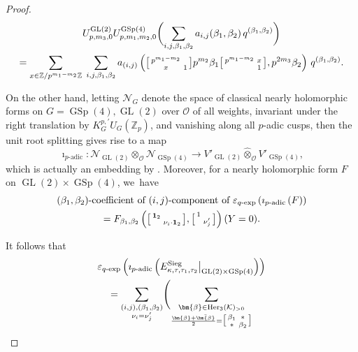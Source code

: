 \documentclass[JEP,XML,SOM,Unicode,published]{cedram}
\newenvironment{smallbmatrix}{\big[\begin{smallmatrix}}{\end{smallmatrix}\big]}
\theoremstyle{plain}
\theoremstyle{remark}
\let\mr\mathrm
\newcommand{\bZ}{\mathbb{Z}}
\newcommand{\cK}{\mathcal{K}}
\newcommand{\cN}{\mathcal{N}}
\newcommand{\cO}{\mathcal{O}}
\newcommand{\bbeta}{\bm{\beta}}
\DeclareMathOperator{\GL}{GL}
\DeclareMathOperator{\GSp}{GSp}
\newcommand{\Sieg}{\mr{Sieg}}
\DeclareMathOperator{\Her}{Her}
\newcommand{\adic}{\text{-}\mathrm{adic}}
\newcommand{\qexp}{q\text{-}\mathrm{exp}}
\newcommand{\bid}{\mathbf{1}}
\begin{document}
\begin{proof}
\begin{multline*}
U^{\GL(2)}_{p,m_3,0}U^{\GSp(4)}_{p,m_1,m_2,0}\biggl(\sum_{i,j,\beta_1,\beta_2} a_{i,j}(\beta_1,\beta_2)\,q^{(\beta_1,\beta_2)}\biggr)\\
=\sum_{x\in\bZ/p^{m_1-m_2}\bZ}\;
\sum_{i,j,\beta_1,\beta_2} a_{(i,j)}\left(\begin{smallbmatrix}p^{m_1-m_2}&\\ x&1\end{smallbmatrix}p^{m_2}\beta_1\begin{smallbmatrix}p^{m_1-m_2}&x\\&1\end{smallbmatrix},p^{2m_3}\beta_2\right)\,q^{(\beta_1,\beta_2)}.
\end{multline*}

On the other hand, letting $\cN_{G}$ denote the space of classical nearly holomorphic forms on $G=\GSp(4),\GL(2)$ over $\cO$ of all weights, invariant under the right translation by $K^{p,\prime}_G U_G(\bZ_p)$, and vanishing along all $p$-adic cusps, then the unit root splitting \cite[Th.\,4.1]{TDwork} gives rise to a map
\[
\imath_{p\adic}: \cN_{\GL(2)}\otimes_\cO\cN_{\GSp(4)}\to V'_{\GL(2)}\hat{\otimes}_{\cO} V'_{\GSp(4)},
\]
which is actually an embedding by \cite[Prop.\,3.12.1]{NHF}. Moreover, for a nearly holomorphic form $F$ on $\GL(2)\times\GSp(4)$, we~have
\begin{multline*}
(\beta_1,\beta_2)\text{-coefficient of }(i,j)\text{-component of }\varepsilon_{\qexp}\left(\imath_{p\adic} \left(F\right)\right)\\
= F_{\beta_1,\beta_2}\left(\begin{smallbmatrix}\bid_2\\&\nu_i\cdot\bid_2\end{smallbmatrix},\begin{smallbmatrix}1\\&\nu'_j\end{smallbmatrix}\right)(Y=0).
\end{multline*}
\begin{minipage}{\textwidth}
It follows that
\begin{multline*}
\varepsilon_{\qexp}\left(\imath_{p\adic} \left(E^\Sieg_{\kappa,\tau,\tau_1,\tau_2}\big|_{\GL(2)\times\GSp(4)}\right)\right)\\
= \sum_{\substack{(i,j),(\beta_1,\beta_2)\\ \nu_i=\nu'_j}} \Biggl(\sum_{\substack{\bbeta\in\Her_3(\cK)_{>0}\\[.5ex]\frac{\bbeta+\bar{\bbeta}}{2}=\begin{smallbmatrix}\beta_1&\ast\\ \ast&\beta_2\end{smallbmatrix}}}

\end{multline*}
\end{minipage}
\end{proof}
\end{document}
